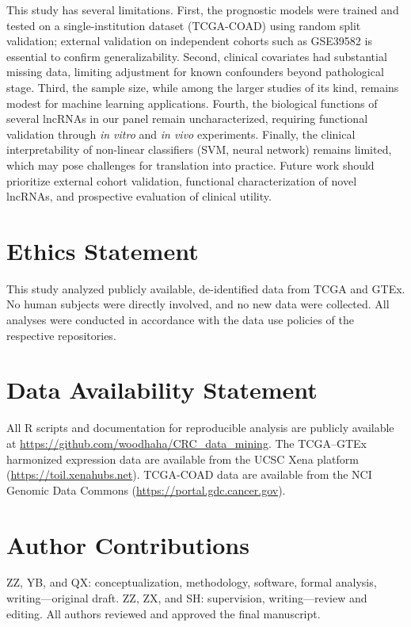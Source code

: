 \documentclass[12pt,a4paper]{article}
\begin{document}
This study has several limitations. First, the prognostic models were trained and tested on a single-institution dataset (TCGA-COAD) using random split validation; external validation on independent cohorts such as GSE39582 is essential to confirm generalizability. Second, clinical covariates had substantial missing data, limiting adjustment for known confounders beyond pathological stage. Third, the sample size, while among the larger studies of its kind, remains modest for machine learning applications. Fourth, the biological functions of several lncRNAs in our panel remain uncharacterized, requiring functional validation through \textit{in vitro} and \textit{in vivo} experiments. Finally, the clinical interpretability of non-linear classifiers (SVM, neural network) remains limited, which may pose challenges for translation into practice. Future work should prioritize external cohort validation, functional characterization of novel lncRNAs, and prospective evaluation of clinical utility.

\section{Ethics Statement}

This study analyzed publicly available, de-identified data from TCGA and GTEx. No human subjects were directly involved, and no new data were collected. All analyses were conducted in accordance with the data use policies of the respective repositories.

\section{Data Availability Statement}

All R scripts and documentation for reproducible analysis are publicly available at \url{https://github.com/woodhaha/CRC_data_mining}. The TCGA--GTEx harmonized expression data are available from the UCSC Xena platform (\url{https://toil.xenahubs.net}). TCGA-COAD data are available from the NCI Genomic Data Commons (\url{https://portal.gdc.cancer.gov}).

\section{Author Contributions}

ZZ, YB, and QX: conceptualization, methodology, software, formal analysis, writing---original draft. ZZ, ZX, and SH: supervision, writing---review and editing. All authors reviewed and approved the final manuscript.
\end{document}
